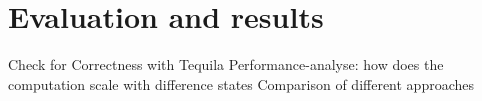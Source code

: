 \chapter{Evaluation and results}
\label{c:evaluation}


\begin{outline}
	\1 Check for Correctness with Tequila
	\1 Performance-analyse: how does the computation scale with difference states
	\1 Comparison of different approaches
\end{outline}
